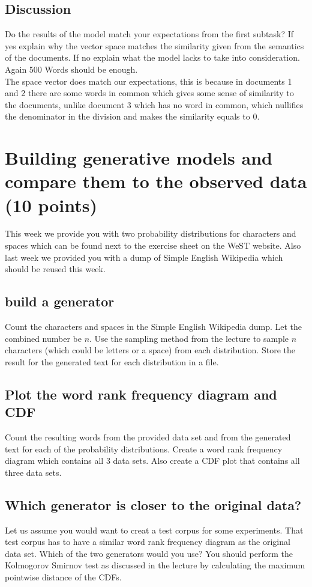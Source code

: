 \documentclass{WeSTassignment}
\begin{document}
\subsection{Discussion}
Do the results of the model match your expectations from the first subtask? If yes explain why the vector space matches the similarity given from the semantics of the documents. If no explain what the model lacks to take into consideration. Again 500 Words should be enough. 
\\ The space vector does match our expectations, this is because in documents 1 and 2 there are some words in common which gives some sense of similarity to the documents, unlike document 3 which has no word in common, which nullifies the denominator in the division and makes the similarity equals to 0.



\section{Building generative models and compare them to the observed data (10 points)}
This week we provide you with two probability distributions for characters and spaces which can be found next to the exercise sheet on the WeST website. Also last week we provided you with a dump of Simple English Wikipedia which should be reused this week.

\subsection{build a generator}
Count the characters and spaces in the Simple English Wikipedia dump. Let the combined number be $n$. 
Use the sampling method from the lecture to sample $n$ characters (which could be letters or a space) from each distribution.
Store the result for the generated text for each distribution in a file.

\subsection{Plot the word rank frequency diagram and CDF}
Count the resulting words from the provided data set and from the generated text for each of the probability distributions. 
Create a word rank frequency diagram which contains all 3 data sets. 
Also create a CDF plot that contains all three data sets. 

\subsection{Which generator is closer to the original data?}
Let us assume you would want to creat a test corpus for some experiments. That test corpus has to have a similar word rank frequency diagram as the original data set. Which of the two generators would you use? You should perform the Kolmogorov Smirnov test as discussed in the lecture by calculating the maximum pointwise distance of the CDFs. 
\end{document}
